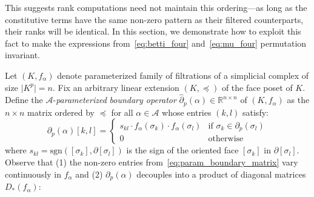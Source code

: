 \documentclass[10pt]{article}
\numberwithin{equation}{section}
\newcommand{\+}{%
	\raisebox{0.18ex}{\scaleobj{0.55}{+}}
}
\theoremstyle{definition}
\newtheorem{definition}{Definition}
\theoremstyle{definition}
\begin{document}
This suggests rank computations need not maintain this ordering---as long as the constitutive terms have the same non-zero pattern as their filtered counterparts, their ranks will be identical.
In this section, we demonstrate how to exploit this fact to make the expressions from~\eqref{eq:betti_four} and~\eqref{eq:mu_four} permutation invariant.

Let $(K, f_\alpha)$ denote parameterized family of filtrations of a simplicial complex of size $\lvert K^p \rvert = n$. Fix an arbitrary linear extension $(K, \preceq)$ of the face poset of $K$. 
Define the $\mathcal{A}$-\emph{parameterized} \emph{boundary operator} $\hat{\partial}_p(\alpha) \in \mathbb{R}^{n \times n}$ of $(K, f_\alpha)$ as the $n \times n$ matrix ordered by $\preceq$ for all $\alpha \in \mathcal{A}$ whose entries $(k,l)$ satisfy:
\begin{equation}\label{eq:param_boundary_matrix}
	\partial_p(\alpha)[k,l] = \begin{cases}
s_{kl} \cdot f_\alpha(\sigma_k) \cdot f_\alpha(\sigma_l) & \text{if } \sigma_k \in \partial_p(\sigma_l)\\
	0 & \text{otherwise}
\end{cases}
\end{equation}
where $s_{kl} = \mathrm{sgn}([\sigma_k], \partial [\sigma_l])$ is the sign of the oriented face $[\sigma_k]$ in $\partial[\sigma_l]$.
\noindent
Observe that (1) the non-zero entries from~\eqref{eq:param_boundary_matrix} vary continuously in $f_\alpha$ and (2) $\partial_p(\alpha)$ decouples into a product of diagonal matrices $D_\ast(f_\alpha)$: 
\end{document}
